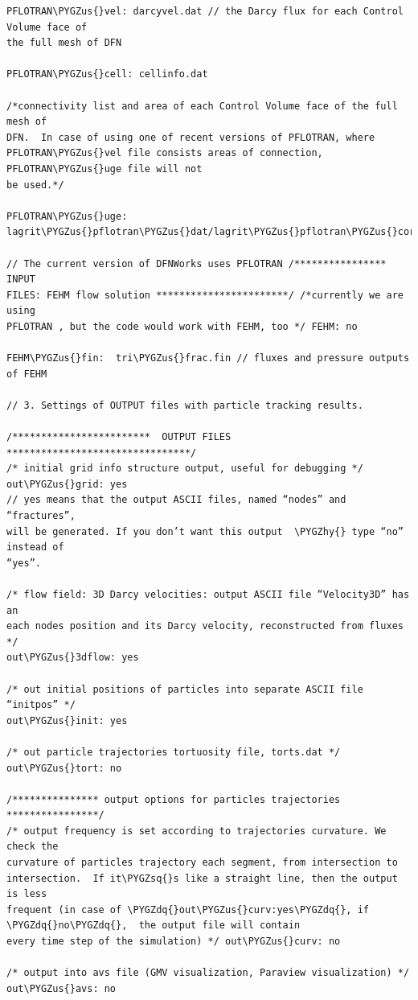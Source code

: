 \documentclass[letterpaper,10pt,english]{sphinxmanual}
\def\PYGZus{\char`\_}
\def\PYGZhy{\char`\-}
\def\PYGZsq{\char`\'}
\def\PYGZdq{\char`\"}
\renewcommand\PYGZsq{\textquotesingle}
\begin{document}
\begin{Verbatim}[commandchars=\\\{\}]
PFLOTRAN\PYGZus{}vel: darcyvel.dat // the Darcy flux for each Control Volume face of
the full mesh of DFN

PFLOTRAN\PYGZus{}cell: cellinfo.dat

/*connectivity list and area of each Control Volume face of the full mesh of
DFN.  In case of using one of recent versions of PFLOTRAN, where
PFLOTRAN\PYGZus{}vel file consists areas of connection, PFLOTRAN\PYGZus{}uge file will not
be used.*/

PFLOTRAN\PYGZus{}uge: lagrit\PYGZus{}pflotran\PYGZus{}dat/lagrit\PYGZus{}pflotran\PYGZus{}corrected.uge

// The current version of DFNWorks uses PFLOTRAN /**************** INPUT
FILES: FEHM flow solution ***********************/ /*currently we are using
PFLOTRAN , but the code would work with FEHM, too */ FEHM: no

FEHM\PYGZus{}fin:  tri\PYGZus{}frac.fin // fluxes and pressure outputs of FEHM

// 3. Settings of OUTPUT files with particle tracking results.

/************************  OUTPUT FILES  ********************************/
/* initial grid info structure output, useful for debugging */ out\PYGZus{}grid: yes
// yes means that the output ASCII files, named “nodes” and “fractures”,
will be generated. If you don’t want this output  \PYGZhy{} type “no” instead of
“yes”.

/* flow field: 3D Darcy velocities: output ASCII file “Velocity3D” has an
each nodes position and its Darcy velocity, reconstructed from fluxes */
out\PYGZus{}3dflow: yes

/* out initial positions of particles into separate ASCII file “initpos” */
out\PYGZus{}init: yes

/* out particle trajectories tortuosity file, torts.dat */ out\PYGZus{}tort: no

/*************** output options for particles trajectories ****************/
/* output frequency is set according to trajectories curvature. We check the
curvature of particles trajectory each segment, from intersection to
intersection.  If it\PYGZsq{}s like a straight line, then the output is less
frequent (in case of \PYGZdq{}out\PYGZus{}curv:yes\PYGZdq{}, if \PYGZdq{}no\PYGZdq{},  the output file will contain
every time step of the simulation) */ out\PYGZus{}curv: no

/* output into avs file (GMV visualization, Paraview visualization) */
out\PYGZus{}avs: no


\end{Verbatim}
\end{document}

